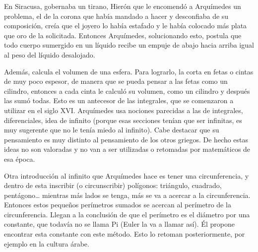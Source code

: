 En Siracusa, gobernaba un tirano, Hierón que le encomendó a Arquímedes un problema, el de la corona que había mandado a hacer y desconfiaba de su composición, creía que el joyero lo había estafado y le había colocado más plata que oro de la solicitada. Entonces Arquímedes, solucionando esto, postula que todo cuerpo sumergido en un líquido recibe un empuje de abajo hacia arriba igual al peso del líquido desalojado. 

Además, calcula el volumen de una esfera. Para lograrlo, la corta en fetas o cintas de muy poco espesor, de manera que se pueda pensar a las fetas como un cilindro, entonces a cada cinta le calculó su volumen, como un cilindro y después las sumó todas. Esto es un antecesor de las integrales, que se comenzaron a utilizar en el siglo XVI. Arquímedes usa nociones parecidas a las de integrales, diferenciales, idea de infinito (porque esas secciones tenían que ser infinitas, es muy sugerente que no le tenía miedo al infinito). Cabe destacar que su pensamiento es muy distinto al pensamiento de los otros griegos. De hecho estas ideas no son valoradas y no van a ser utilizadas o retomadas por matemáticos de esa época.

Otra introducción al infinito que Arquímedes hace es tener una circunferencia, y dentro de esta inscribir (o circunscribir) polígonos: triángulo, cuadrado, pentágono… mientras más lados se tenga, más se va a acercar a la circunferencia. Entonces estos pequeños perímetros sumados se acercan al perímetro de la circunferencia. Llegan a la conclusión de que el perímetro es el diámetro por una constante, que todavía no se llama Pi (Euler la va a llamar así). Él propone encontrar esta constante con este método. Esto lo retoman posteriormente, por ejemplo en la cultura árabe.
